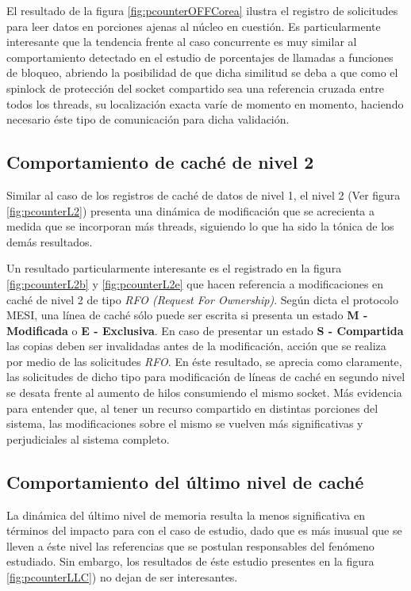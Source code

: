 El resultado de la figura \ref{fig:pcounterOFFCorea} ilustra el registro de solicitudes para leer datos en porciones ajenas al núcleo en cuestión. Es particularmente interesante que la tendencia frente al caso concurrente es muy similar al comportamiento detectado en el estudio de porcentajes de llamadas a funciones de bloqueo, abriendo la posibilidad de que dicha similitud se deba a que como el spinlock de protección del socket compartido sea una referencia cruzada entre todos los threads, su localización exacta varíe de momento en momento, haciendo necesario éste tipo de comunicación para dicha validación.

\subsection{Comportamiento de caché de nivel 2}
Similar al caso de los registros de caché de datos de nivel 1, el nivel 2 (Ver figura \ref{fig:pcounterL2}) presenta una dinámica de modificación que se acrecienta a medida que se incorporan más threads, siguiendo lo que ha sido la tónica de los demás resultados.

Un resultado particularmente interesante es el registrado en la figura \ref{fig:pcounterL2b} y \ref{fig:pcounterL2e} que hacen referencia a modificaciones en caché de nivel 2 de tipo \emph{RFO (Request For Ownership)}. Según dicta el protocolo MESI, una línea de caché sólo puede ser escrita si presenta un estado \textbf{M - Modificada} o \textbf{E - Exclusiva}. En caso de presentar un estado \textbf{S - Compartida} las copias deben ser invalidadas antes de la modificación, acción que se realiza por medio de las solicitudes \emph{RFO}. En éste resultado, se aprecia como claramente, las solicitudes de dicho tipo para modificación de líneas de caché en segundo nivel se desata frente al aumento de hilos consumiendo el mismo socket. Más evidencia para entender que, al tener un recurso compartido en distintas porciones del sistema, las modificaciones sobre el mismo se vuelven más significativas y perjudiciales al sistema completo.

\subsection{Comportamiento del último nivel de caché}
La dinámica del último nivel de memoria resulta la menos significativa en términos del impacto para con el caso de estudio, dado que es más inusual que se lleven a éste nivel las referencias que se postulan responsables del fenómeno estudiado. Sin embargo, los resultados de éste estudio presentes en la figura \ref{fig:pcounterLLC}) no dejan de ser interesantes.

